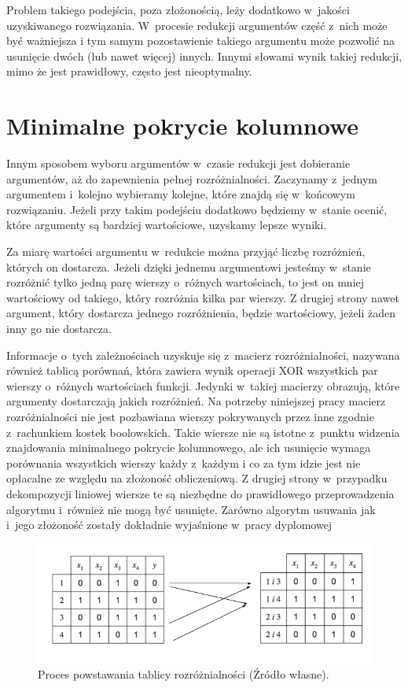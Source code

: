 Problem takiego podejścia,
poza złożonością,
leży dodatkowo w~jakości uzyskiwanego rozwiązania.
W~procesie redukcji argumentów część z~nich może być ważniejsza
i tym samym pozostawienie takiego argumentu może pozwolić na usunięcie dwóch (lub nawet więcej) innych.
Innymi słowami wynik takiej redukcji,
mimo że jest prawidłowy,
często jest nieoptymalny.

\section{Minimalne pokrycie kolumnowe}

Innym sposobem wyboru argumentów w~czasie redukcji jest dobieranie argumentów,
aż do zapewnienia pełnej rozróżnialności.
Zaczynamy z~jednym argumentem i~kolejno wybieramy kolejne,
które znajdą się w~końcowym rozwiązaniu.
Jeżeli przy takim podejściu dodatkowo będziemy w~stanie ocenić,
które argumenty są bardziej wartościowe,
uzyskamy lepsze wyniki.

Za miarę wartości argumentu w~redukcie można przyjąć liczbę rozróżnień,
których on dostarcza.
Jeżeli dzięki jednemu argumentowi jesteśmy w~stanie rozróżnić tylko jedną parę wierszy o~różnych wartościach,
to jest on mniej wartościowy od takiego,
który rozróżnia kilka par wierszy.
Z drugiej strony nawet argument,
który dostarcza jednego rozróżnienia,
będzie wartościowy,
jeżeli żaden inny go nie dostarcza.

Informacje o~tych zależnościach uzyskuje się z~macierz rozróżnialności, nazywana również tablicą porównań,
która zawiera wynik operacji XOR wszystkich par wierszy o~różnych wartościach funkcji.
Jedynki w~takiej macierzy obrazują,
które argumenty dostarczają jakich rozróżnień.
Na potrzeby niniejszej pracy macierz rozróżnialności nie jest pozbawiana wierszy pokrywanych przez inne zgodnie z~rachunkiem kostek boolowskich.
Takie wiersze nie są istotne z~punktu widzenia znajdowania minimalnego pokrycie kolumnowego,
ale ich usunięcie wymaga porównania wszystkich wierszy każdy z~każdym
i co za tym idzie jest nie opłacalne ze względu na złożoność obliczeniową.
Z drugiej strony w~przypadku dekompozycji liniowej wiersze te są niezbędne do prawidłowego przeprowadzenia algorytmu i~również nie mogą być usunięte.
Zarówno algorytm usuwania jak i~jego złożoność zostały dokładnie wyjaśnione w~pracy dyplomowej \cite{inzynierka}

\begin{figure}[H]
\centering
\includegraphics[width = 13cm]{chapter02/discernibility-table.png}
\caption{Proces powstawania tablicy rozróżnialności (Źródło własne).}
\end{figure}

